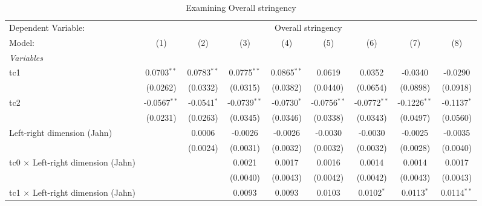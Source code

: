 
\begin{table}[htbp]
   \caption{Examining Overall stringency}
   \centering
   \begin{tabular}{lcccccccc}
      \tabularnewline \midrule \midrule
      Dependent Variable: & \multicolumn{8}{c}{Overall stringency}\\
      Model:                                    & (1)            & (2)           & (3)            & (4)           & (5)            & (6)            & (7)            & (8)\\  
      \midrule
      \emph{Variables}\\
      tc1                                       & 0.0703$^{**}$  & 0.0783$^{**}$ & 0.0775$^{**}$  & 0.0865$^{**}$ & 0.0619         & 0.0352         & -0.0340        & -0.0290\\   
                                                & (0.0262)       & (0.0332)      & (0.0315)       & (0.0382)      & (0.0440)       & (0.0654)       & (0.0898)       & (0.0918)\\   
      tc2                                       & -0.0567$^{**}$ & -0.0541$^{*}$ & -0.0739$^{**}$ & -0.0730$^{*}$ & -0.0756$^{**}$ & -0.0772$^{**}$ & -0.1226$^{**}$ & -0.1137$^{*}$\\   
                                                & (0.0231)       & (0.0263)      & (0.0345)       & (0.0346)      & (0.0338)       & (0.0343)       & (0.0497)       & (0.0560)\\   
      Left-right dimension (Jahn)               &                & 0.0006        & -0.0026        & -0.0026       & -0.0030        & -0.0030        & -0.0025        & -0.0035\\   
                                                &                & (0.0024)      & (0.0031)       & (0.0032)      & (0.0032)       & (0.0032)       & (0.0028)       & (0.0040)\\   
      tc0 $\times$ Left-right dimension (Jahn)  &                &               & 0.0021         & 0.0017        & 0.0016         & 0.0014         & 0.0014         & 0.0017\\   
                                                &                &               & (0.0040)       & (0.0043)      & (0.0042)       & (0.0042)       & (0.0043)       & (0.0043)\\   
      tc1 $\times$ Left-right dimension (Jahn)  &                &               & 0.0093         & 0.0093        & 0.0103         & 0.0102$^{*}$   & 0.0113$^{*}$   & 0.0114$^{**}$\\   

\end{tabular}
\end{table}
